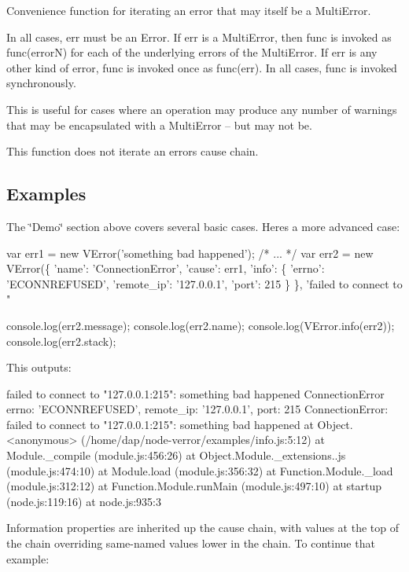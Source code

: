 Convenience function for iterating an error that may itself be a Multi\+Error.

In all cases, {\ttfamily err} must be an Error. If {\ttfamily err} is a Multi\+Error, then {\ttfamily func} is invoked as {\ttfamily func(error\+N)} for each of the underlying errors of the Multi\+Error. If {\ttfamily err} is any other kind of error, {\ttfamily func} is invoked once as {\ttfamily func(err)}. In all cases, {\ttfamily func} is invoked synchronously.

This is useful for cases where an operation may produce any number of warnings that may be encapsulated with a Multi\+Error -- but may not be.

This function does not iterate an error\textquotesingle{}s cause chain.

\subsection*{Examples}

The \char`\"{}\+Demo\char`\"{} section above covers several basic cases. Here\textquotesingle{}s a more advanced case\+:


\begin{DoxyCode}
var err1 = new VError('something bad happened');
/* ... */
var err2 = new VError(\{
    'name': 'ConnectionError',
    'cause': err1,
    'info': \{
        'errno': 'ECONNREFUSED',
        'remote\_ip': '127.0.0.1',
        'port': 215
    \}
\}, 'failed to connect to "%

console.log(err2.message);
console.log(err2.name);
console.log(VError.info(err2));
console.log(err2.stack);
\end{DoxyCode}


This outputs\+: \begin{DoxyVerb}failed to connect to "127.0.0.1:215": something bad happened
ConnectionError
{ errno: 'ECONNREFUSED', remote_ip: '127.0.0.1', port: 215 }
ConnectionError: failed to connect to "127.0.0.1:215": something bad happened
    at Object.<anonymous> (/home/dap/node-verror/examples/info.js:5:12)
    at Module._compile (module.js:456:26)
    at Object.Module._extensions..js (module.js:474:10)
    at Module.load (module.js:356:32)
    at Function.Module._load (module.js:312:12)
    at Function.Module.runMain (module.js:497:10)
    at startup (node.js:119:16)
    at node.js:935:3
\end{DoxyVerb}


Information properties are inherited up the cause chain, with values at the top of the chain overriding same-\/named values lower in the chain. To continue that example\+:


